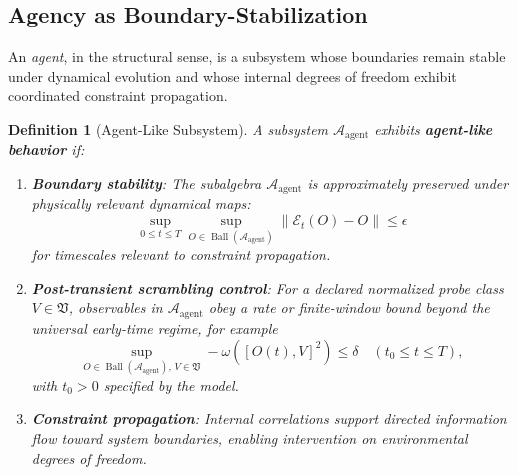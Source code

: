 \documentclass[11pt,a4paper]{article}
\newtheorem{definition}{Definition}[section]
\begin{document}
\subsection{Agency as Boundary-Stabilization}
\label{sec:II.2}

An \emph{agent}, in the structural sense, is a subsystem whose boundaries remain stable under dynamical evolution and whose internal degrees of freedom exhibit coordinated constraint propagation.

\begin{definition}[Agent-Like Subsystem]
\label{def:agent-subsystem}
A subsystem $\mathcal{A}_{\text{agent}}$ exhibits \textbf{agent-like behavior} if:
\begin{enumerate}
\item \textbf{Boundary stability}: The subalgebra $\mathcal{A}_{\text{agent}}$ is approximately preserved under physically relevant dynamical maps:
\begin{equation}
\sup_{0\le t\le T}
\sup_{O\in\operatorname{Ball}(\mathcal A_{\text{agent}})}
\|\mathcal E_t(O)-O\|\le\epsilon
\end{equation}
for timescales relevant to constraint propagation.

\item \textbf{Post-transient scrambling control}: For a declared normalized probe class $V\in\mathfrak V$, observables in $\mathcal{A}_{\text{agent}}$ obey a rate or finite-window bound beyond the universal early-time regime, for example
\begin{equation}
\sup_{O\in\operatorname{Ball}(\mathcal A_{\text{agent}}),\,V\in\mathfrak V}
-\omega([O(t),V]^2)\le\delta
\quad(t_0\le t\le T),
\end{equation}
with $t_0>0$ specified by the model.

\item \textbf{Constraint propagation}: Internal correlations support directed information flow toward system boundaries, enabling intervention on environmental degrees of freedom.
\end{enumerate}
\end{definition}
\end{document}
